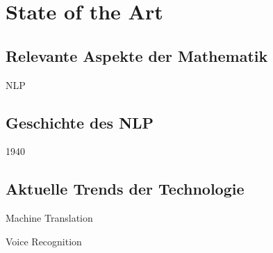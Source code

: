 \chapter{State of the Art}\label{ch:data}

\section{Relevante Aspekte der Mathematik}

NLP

\section{Geschichte des NLP}

1940

\section{Aktuelle Trends der Technologie}

Machine Translation

Voice Recognition
